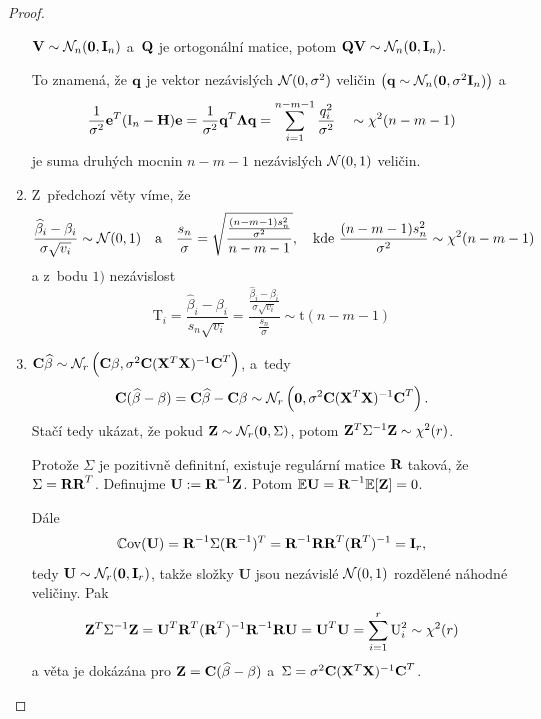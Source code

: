 \begin{proof}
\begin{enumerate}
\begin{theorem}
	 $\textbf{V} \sim \mathcal{N}_n (\boldsymbol{0}, \textbf{I}_{n})$ a~$\textbf{Q}$ je ortogonální matice, potom $\textbf{Q} \textbf{V} \sim \mathcal{N}_n (\boldsymbol{0}, \textbf{I}_{n}).$
\end{theorem}
\vspace{0.1cm}
To znamená, že $\textbf{q}$ je vektor nezávislých $\mathcal{N}(0,\sigma^2)$ veličin $\left(\textbf{q} \sim \mathcal{N}_n (\boldsymbol{0}, \sigma^2 \textbf{I}_{n})\right)$ a
 $$ \frac{1}{\sigma^2} \mathbf{e}^T (\text{I}_n - \textbf{H}) \mathbf{e} = \frac{1}{\sigma^2} \textbf{q}^T \mathbf{\Lambda} \textbf{q} = \sum_{i = 1}^{n-m-1}\frac{q_i^2}{\sigma^2} \quad \sim \chi^2 (n - m - 1) $$
je suma druhých mocnin $n-m-1$ nezávislých $\mathcal{N}(0,1)$ veličin.
\item Z~předchozí věty víme, že
 $$
  \frac{\widehat{\beta}_i - \beta_i}{\sigma \sqrt{v_i}} \sim \mathcal{N}(0,1) \quad \text{a} \quad \frac{s_n}{\sigma} = \sqrt{\frac{\frac{(n-m-1) s_n^2}{\sigma^2}}{n-m-1}},\quad\text{kde }  \frac{(n-m-1) s_n^2}{\sigma^2}\sim \chi^2(n-m-1)
 $$
a z~bodu $1)$ nezávislost
\begin{equation}
  \text{T}_i = \frac{\widehat{\beta}_i - \beta_i}{s_n \sqrt{v_i}} = \frac{\frac{\widehat{\beta}_i - \beta_i}{\sigma \sqrt{v_i}}}{\frac{s_n}{\sigma}} \sim \mathrm{t}(n-m-1)
\label{Rozdeleni_T}
\end{equation}
\item
 $\textbf{C} \widehat{\beta} \sim \mathcal{N}_r \left(\textbf{C} \beta, \sigma^2 \textbf{C} (\mathbf{X}^T \mathbf{X})^{-1} \textbf{C}^T \right)$, a~tedy
 $$ \textbf{C} (\widehat{\beta} - \beta) = \textbf{C}\widehat{\beta} - \textbf{C} \beta \sim \mathcal{N}_r \left(\boldsymbol{0}, \sigma^2 \textbf{C} (\mathbf{X}^T \mathbf{X})^{-1} \textbf{C}^T\right). $$
Stačí tedy ukázat, že pokud $\mathbf{Z} \sim \mathcal{N}_r (\boldsymbol{0}, \Sigma)$, potom $\mathbf{Z}^T {\Sigma^{-1}} \mathbf{Z} \sim \chi^2(r)$.

Protože $\Sigma$ je pozitivně definitní, existuje regulární matice $\textbf{R}$ taková, že $\Sigma = \textbf{R}\textbf{R}^T$. Definujme $\textbf{U} := \textbf{R}^{-1} \mathbf{Z}$. Potom $\mathbb{E} \textbf{U} = \textbf{R}^{-1} \mathbb{E} [\mathbf{Z}] = 0$.

Dále
$$\mathbb{C}\mathrm{ov}(\textbf{U}) = \textbf{R}^{-1} \Sigma (\textbf{R}^{-1})^T = \textbf{R}^{-1} \textbf{R}\textbf{R}^T (\textbf{R}^T)^{-1} = \textbf{I}_r,$$
 tedy $\textbf{U} \sim \mathcal{N}_r (\boldsymbol{0}, \textbf{I}_r)$, takže složky \textbf{U} jsou nezávislé $\mathcal{N}(0,1)$ rozdělené náhodné veličiny. Pak
 $$ \mathbf{Z}^T \Sigma^{-1} \mathbf{Z} = \textbf{U}^T \textbf{R}^T (\textbf{R}^T)^{-1} \textbf{R}^{-1} \textbf{R} \textbf{U} = \textbf{U}^T \textbf{U} = \sum_{i=1}^r \text{U}_i^2 \sim \chi^2(r) $$
a věta je dokázána pro $\mathbf{Z} = \textbf{C} (\widehat{\beta} - \beta)$ a~$\Sigma = \sigma^2 \textbf{C} (\mathbf{X}^T \mathbf{X})^{-1} \textbf{C}^T$.

\end{enumerate}
\end{proof}

